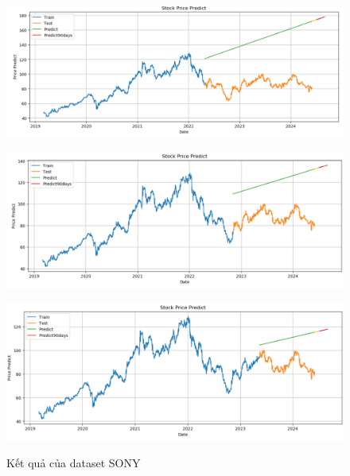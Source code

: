 \documentclass[conference]{IEEEtran}
\begin{document}
\begin{figure}[H]
    \centering
    \begin{minipage}{0.15\textwidth}
    \centering
    \includegraphics[width=1\textwidth]{Image/Linear/Linear_SONY_6_4.png}
   
    \label{fig:1}
    \end{minipage}%
    \begin{minipage}{0.15\textwidth}
    \centering
    \includegraphics[width=1\textwidth]{Image/Linear/Linear_SONY_7_3.png}
  
    \label{fig:2}
    \end{minipage}%
    \begin{minipage}{0.15\textwidth}
    \centering
    \includegraphics[width=1\textwidth]{Image/Linear/Linear_SONY_8_2.png}

    \label{fig:3}
    \end{minipage}
    \caption{Kết quả của dataset SONY }
\end{figure}
\end{document}
